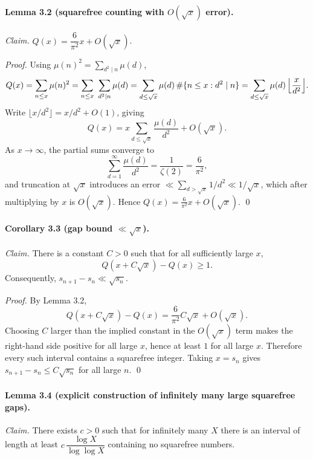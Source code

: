 \paragraph{Lemma 3.2 (squarefree counting with $O(\sqrt{x})$ error).}
\emph{Claim.} $Q(x)=\dfrac{6}{\pi^2}x + O(\sqrt{x})$.

\emph{Proof.}
Using $\mu(n)^2 = \sum_{d^2\mid n}\mu(d)$,
\[
Q(x)=\sum_{n\le x}\mu(n)^2
=\sum_{n\le x}\ \sum_{d^2\mid n}\mu(d)
=\sum_{d\le \sqrt{x}}\mu(d)\,\#\{n\le x: d^2\mid n\}
=\sum_{d\le \sqrt{x}}\mu(d)\,\Bigl\lfloor\frac{x}{d^2}\Bigr\rfloor.
\]
Write $\lfloor x/d^2\rfloor = x/d^2 + O(1)$, giving
\[
Q(x)= x\sum_{d\le \sqrt{x}}\frac{\mu(d)}{d^2} + O(\sqrt{x}).
\]
As $x\to\infty$, the partial sums converge to
\[
\sum_{d=1}^{\infty}\frac{\mu(d)}{d^2} = \frac{1}{\zeta(2)}=\frac{6}{\pi^2},
\]
and truncation at $\sqrt{x}$ introduces an error $\ll \sum_{d>\sqrt{x}}1/d^2\ll 1/\sqrt{x}$, which after multiplying by $x$ is $O(\sqrt{x})$.
Hence $Q(x)=\frac{6}{\pi^2}x+O(\sqrt{x})$. \qed

\paragraph{Corollary 3.3 (gap bound $\ll\sqrt{x}$).}
\emph{Claim.} There is a constant $C>0$ such that for all sufficiently large $x$,
\[
Q(x+C\sqrt{x})-Q(x) \ge 1.
\]
Consequently, $s_{n+1}-s_n \ll \sqrt{s_n}$.

\emph{Proof.}
By Lemma 3.2,
\[
Q(x+C\sqrt{x})-Q(x)
=\frac{6}{\pi^2}C\sqrt{x} + O(\sqrt{x}).
\]
Choosing $C$ larger than the implied constant in the $O(\sqrt{x})$ term makes the right-hand side positive for all large $x$, hence at least $1$ for all large $x$.
Therefore every such interval contains a squarefree integer.
Taking $x=s_n$ gives $s_{n+1}-s_n\le C\sqrt{s_n}$ for all large $n$. \qed

\paragraph{Lemma 3.4 (explicit construction of infinitely many large squarefree gaps).}
\emph{Claim.} There exists $c>0$ such that for infinitely many $X$ there is an interval of length at least
$c\,\dfrac{\log X}{\log\log X}$ containing no squarefree numbers.

